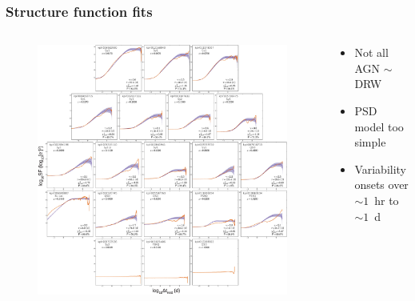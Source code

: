 \documentclass[hyperref={pdfpagelabels=false}]{beamer}
\begin{document}
\begin{frame}
\frametitle{Structure function fits} 
  \begin{columns}
    \centering
    \begin{column}{0.65\textwidth}
      \begin{figure}
        \includegraphics[scale=0.45]{images/AllSF.jpg}
      \end{figure}
    \end{column}
    \begin{column}{0.35\textwidth}
        \begin{itemize}
        \item Not all AGN $\sim$ DRW
        \item PSD model too simple
        \item Variability onsets over $\sim 1$~hr to $\sim 1$~d
        \end{itemize}
          {\tiny \citet*{Kasliwal15}}
    \end{column}
  \end{columns}
\end{frame}
\end{document}
